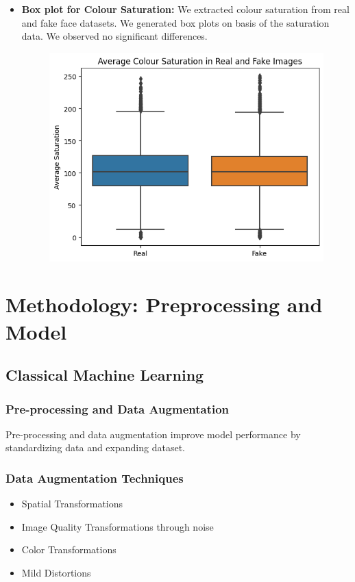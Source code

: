 \documentclass[10pt,twocolumn,letterpaper]{article}
\begin{document}
\begin{itemize}
    \item \textbf{Box plot for Colour Saturation:} We extracted colour saturation from real and fake face datasets. We generated box plots on basis of the saturation data. We observed no significant differences.
    \begin{figure}[H]
    \centering
    \includegraphics[scale=0.3]{6.png}
    \end{figure}

\end{itemize}


\section{Methodology: Preprocessing and Model}
\subsection{Classical Machine Learning}

\subsubsection{Pre-processing and Data Augmentation}

Pre-processing and data augmentation improve model performance by standardizing data and expanding dataset.
\subsubsection{Data Augmentation Techniques}

\begin{itemize}
    \item Spatial Transformations
    
    \item Image Quality Transformations through noise 
    
    \item Color Transformations
    
    \item Mild Distortions
\end{itemize}
\end{document}
